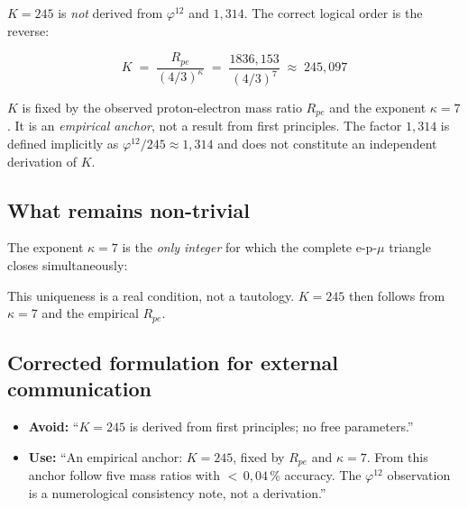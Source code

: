 $K = 245$ is \emph{not} derived from $\varphi^{12}$ and $1{,}314$. The correct
logical order is the reverse:

\begin{equation}
  K \;=\; \frac{R_{pe}}{(4/3)^\kappa}
    \;=\; \frac{1836{,}153}{(4/3)^7}
    \;\approx\; 245{,}097
  \tag{190.14}
\end{equation}

$K$ is fixed by the observed proton-electron mass ratio $R_{pe}$ and the
exponent $\kappa = 7$. It is an \emph{empirical anchor}, not a result from
first principles. The factor $1{,}314$ is defined implicitly as
$\varphi^{12} / 245 \approx 1{,}314$ and does not constitute an independent
derivation of $K$.

\subsection*{What remains non-trivial}

The exponent $\kappa = 7$ is the \emph{only integer} for which the complete
e-p-$\mu$ triangle closes simultaneously:
\begin{center}
{\footnotesize
{}
}
\end{center}
This uniqueness is a real condition, not a tautology. $K = 245$ then follows
from $\kappa = 7$ and the empirical $R_{pe}$.

\subsection*{Corrected formulation for external communication}

\begin{itemize}
  \item \textbf{Avoid:} \enquote{$K = 245$ is derived from first principles;
        no free parameters.}
  \item \textbf{Use:} \enquote{An empirical anchor: $K = 245$, fixed by
        $R_{pe}$ and $\kappa = 7$. From this anchor follow five mass ratios
        with ${<}\,0{,}04\,\%$ accuracy. The $\varphi^{12}$ observation is a
        numerological consistency note, not a derivation.}
\end{itemize}


